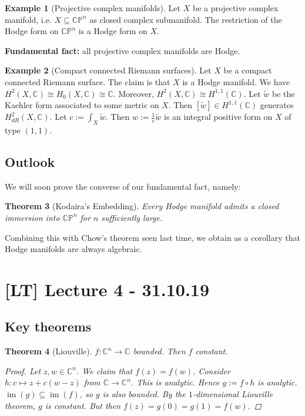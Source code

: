 \documentclass[11pt,A4]{article}
\theoremstyle{plain}
\newtheorem{thm}{Theorem}[section]
\theoremstyle{definition}
\newtheorem{exa}[thm]{Example}
\theoremstyle{remark}
\newcommand{\1}{\mathbbm{1}}
\newcommand{\C}{\mathbb{C}}
\newcommand{\CP}{\mathbb{CP}}
\DeclareMathOperator{\im}{im}
\begin{document}
\begin{exa}[Projective complex manifolds]
    Let $X$ be a projective complex manifold, i.e. $X\subseteq \CP^{n}$ as closed complex submanifold.
    The restriction of the Hodge form on $\CP^{n}$ is a Hodge form on $X$.
\end{exa}

\textbf{Fundamental fact:} all projective complex manifolds are Hodge.

\begin{exa}[Compact connected Riemann surfaces]
    Let $X$ be a compact connected Riemann surface.
    The claim is that $X$ is a Hodge manifold.
    We have $H^{2}(X,\C)\cong H_{0}(X,\C)\cong \C$.
    Moreover, $H^{2}(X,\C)\cong H^{1,1}(\C)$.
    Let $\tilde{w}$ be the Kaehler form associated to some metric on $X$.
    Then $[\tilde{w}]\in H^{1,1}(\C)$ generates $H_{dR}^{2}(X,\C)$.
    Let $c:=\int_{X}\tilde{w}$.
    Then $w:=\frac{1}{c}\tilde{w}$ is an integral positive form on $X$ of type $(1,1)$.
\end{exa}

\subsection{Outlook}

We will soon prove the converse of our fundamental fact, namely:

\begin{thm}[Kodaira's Embedding]
    Every Hodge manifold admits a closed immersion into $\CP^{n}$ for $n$ sufficiently large.
\end{thm}

Combining this with Chow's theorem seen last time, we obtain as a corollary that Hodge manifolds are always algebraic.

\section{[LT] Lecture 4 - 31.10.19}

\subsection{Key theorems}

\begin{thm}[Liouville]
    $f\colon \C^{n}\to \C$ bounded.
    Then $f$ constant.
    \begin{proof}
	Let $z,w\in \C^{n}$.
	We claim that $f(z)=f(w)$.
	Consider $h\colon c\mapsto z+c(w-z)$ from $\C\to \C^{n}$.
	This is analytic.
	Hence $g:=f\circ h$ is analytic.
	$\im(g)\subseteq \im(f)$, so $g$ is also bounded.
	By the $1$-dimensional Liouville theorem, $g$ is constant.
	But then $f(z)=g(0)=g(1)=f(w)$.
    \end{proof}
\end{thm}
\end{document}
